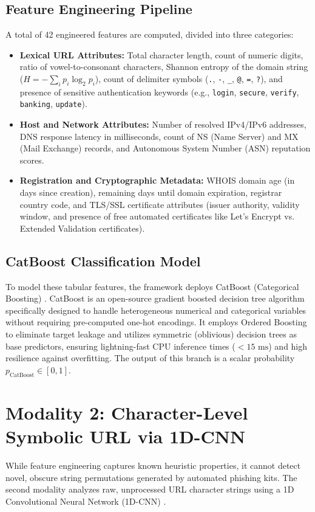 \subsection{Feature Engineering Pipeline}
A total of 42 engineered features are computed, divided into three categories:
\begin{itemize}
\item \textbf{Lexical URL Attributes:} Total character length, count of numeric digits, ratio of vowel-to-consonant characters, Shannon entropy of the domain string ($H = -\sum_i p_i \log_2 p_i$), count of delimiter symbols (\texttt{.}, \texttt{-}, \texttt{\_}, \texttt{@}, \texttt{=}, \texttt{?}), and presence of sensitive authentication keywords (e.g., \texttt{login}, \texttt{secure}, \texttt{verify}, \texttt{banking}, \texttt{update}).
\item \textbf{Host and Network Attributes:} Number of resolved IPv4/IPv6 addresses, DNS response latency in milliseconds, count of NS (Name Server) and MX (Mail Exchange) records, and Autonomous System Number (ASN) reputation scores.
\item \textbf{Registration and Cryptographic Metadata:} WHOIS domain age (in days since creation), remaining days until domain expiration, registrar country code, and TLS/SSL certificate attributes (issuer authority, validity window, and presence of free automated certificates like Let's Encrypt vs. Extended Validation certificates).
\end{itemize}

\subsection{CatBoost Classification Model}
To model these tabular features, the framework deploys CatBoost (Categorical Boosting) \cite{8}. CatBoost is an open-source gradient boosted decision tree algorithm specifically designed to handle heterogeneous numerical and categorical variables without requiring pre-computed one-hot encodings. It employs Ordered Boosting to eliminate target leakage and utilizes symmetric (oblivious) decision trees as base predictors, ensuring lightning-fast CPU inference times ($< 15\text{ ms}$) and high resilience against overfitting. The output of this branch is a scalar probability $p_{\text{CatBoost}} \in [0, 1]$.

\section{Modality 2: Character-Level Symbolic URL via 1D-CNN}
While feature engineering captures known heuristic properties, it cannot detect novel, obscure string permutations generated by automated phishing kits. The second modality analyzes raw, unprocessed URL character strings using a 1D Convolutional Neural Network (1D-CNN) \cite{1,4}.

